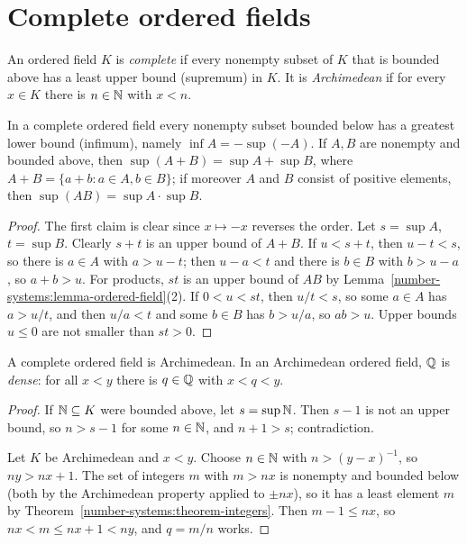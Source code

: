 \section{Complete ordered fields}\label{number-systems:section-complete-ordered-fields}

\begin{definition}\label{number-systems:definition-complete}
An ordered field $K$ is \emph{complete} if every nonempty subset of $K$ that is
bounded above has a least upper bound (supremum) in $K$. It is
\emph{Archimedean} if for every $x \in K$ there is $n \in \mathbb{N}$ with $x < n$.
\end{definition}

\begin{lemma}\label{number-systems:lemma-sup-inf}
In a complete ordered field every nonempty subset bounded below has a greatest
lower bound (infimum), namely $\inf A = -\sup(-A)$. If $A, B$ are nonempty and
bounded above, then $\sup(A + B) = \sup A + \sup B$, where
$A + B = \{a + b : a \in A, b \in B\}$; if moreover $A$ and $B$ consist of positive
elements, then $\sup(AB) = \sup A \cdot \sup B$.
\end{lemma}

\begin{proof}
The first claim is clear since $x \mapsto -x$ reverses the order. Let
$s = \sup A$, $t = \sup B$. Clearly $s + t$ is an upper bound of $A + B$. If
$u < s + t$, then $u - t < s$, so there is $a \in A$ with $a > u - t$; then
$u - a < t$ and there is $b \in B$ with $b > u - a$, so $a + b > u$. For products,
$st$ is an upper bound of $AB$ by Lemma~\ref{number-systems:lemma-ordered-field}(2).
If $0 < u < st$, then $u/t < s$, so some $a \in A$ has $a > u/t$, and then
$u/a < t$ and some $b \in B$ has $b > u/a$, so $ab > u$. Upper bounds $u \leq 0$
are not smaller than $st > 0$.
\end{proof}

\begin{proposition}\label{number-systems:proposition-complete-archimedean}
A complete ordered field is Archimedean. In an Archimedean ordered field,
$\mathbb{Q}$ is \emph{dense}: for all $x < y$ there is $q \in \mathbb{Q}$ with $x < q < y$.
\end{proposition}

\begin{proof}
If $\mathbb{N} \subseteq K$ were bounded above, let $s = \sup \mathbb{N}$. Then $s - 1$ is not an
upper bound, so $n > s - 1$ for some $n \in \mathbb{N}$, and $n + 1 > s$; contradiction.

Let $K$ be Archimedean and $x < y$. Choose $n \in \mathbb{N}$ with $n > (y - x)^{-1}$, so
$ny > nx + 1$. The set of integers $m$ with $m > nx$ is nonempty and bounded below
(both by the Archimedean property applied to $\pm nx$), so it has a least
element $m$ by Theorem~\ref{number-systems:theorem-integers}. Then
$m - 1 \leq nx$, so $nx < m \leq nx + 1 < ny$, and $q = m/n$ works.
\end{proof}

